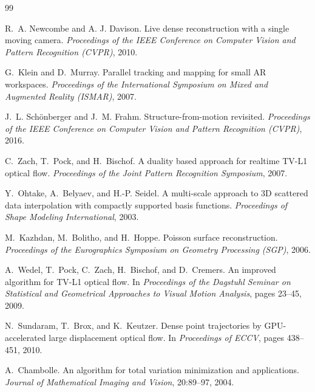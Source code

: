 \documentclass[10pt,twocolumn]{article}
\begin{document}
\begingroup
\renewcommand{\section}[2]{}   %
\small
\begin{thebibliography}{99}

R.~A. Newcombe and A. J. Davison.
\newblock Live dense reconstruction with a single moving camera.
\newblock \textit{Proceedings of the IEEE Conference on Computer Vision and Pattern Recognition (CVPR)}, 2010.

G.~Klein and D.~Murray.
\newblock Parallel tracking and mapping for small AR workspaces.
\newblock \textit{Proceedings of the International Symposium on Mixed and Augmented Reality (ISMAR)}, 2007.

J.~L. Schönberger and J.~M. Frahm.
\newblock Structure-from-motion revisited.
\newblock \textit{Proceedings of the IEEE Conference on Computer Vision and Pattern Recognition (CVPR)}, 2016.

C.~Zach, T.~Pock, and H.~Bischof.
\newblock A duality based approach for realtime TV-L1 optical flow.
\newblock \textit{Proceedings of the Joint Pattern Recognition Symposium}, 2007.

Y.~Ohtake, A.~Belyaev, and H.-P. Seidel.
\newblock A multi-scale approach to 3D scattered data interpolation with compactly supported basis functions.
\newblock \textit{Proceedings of Shape Modeling International}, 2003.

M.~Kazhdan, M.~Bolitho, and H.~Hoppe.
\newblock Poisson surface reconstruction.
\newblock \textit{Proceedings of the Eurographics Symposium on Geometry Processing (SGP)}, 2006.

A.~Wedel, T.~Pock, C.~Zach, H.~Bischof, and D.~Cremers.
\newblock An improved algorithm for {TV-L1} optical flow.
\newblock In \textit{Proceedings of the Dagstuhl Seminar on Statistical and Geometrical Approaches to Visual Motion Analysis}, pages 23--45, 2009.

N.~Sundaram, T.~Brox, and K.~Keutzer.
\newblock Dense point trajectories by {GPU}-accelerated large displacement optical flow.
\newblock In \textit{Proceedings of ECCV}, pages 438--451, 2010.

A.~Chambolle.
\newblock An algorithm for total variation minimization and applications.
\newblock \textit{Journal of Mathematical Imaging and Vision}, 20:89--97, 2004.


\end{thebibliography}
\end{document}
